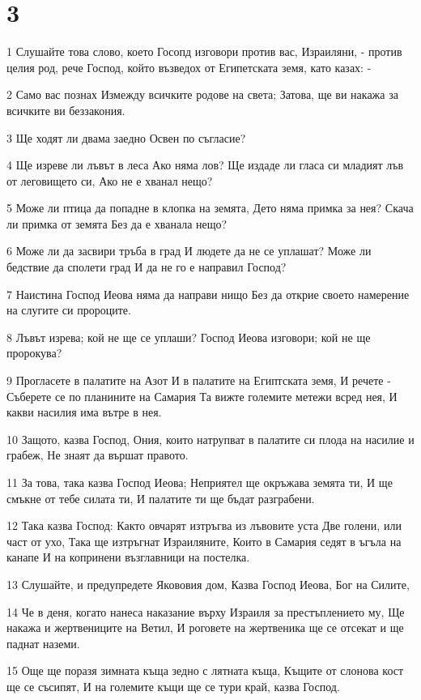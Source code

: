 \chapter{3}

\par 1 Слушайте това слово, което Госопд изговори против вас, Израиляни, - против целия род, рече Господ, който възведох от Египетската земя, като казах: -
\par 2 Само вас познах Измежду всичките родове на света; Затова, ще ви накажа за всичките ви беззакония.
\par 3 Ще ходят ли двама заедно Освен по съгласие?
\par 4 Ще изреве ли лъвът в леса Ако няма лов? Ще издаде ли гласа си младият лъв от леговището си, Ако не е хванал нещо?
\par 5 Може ли птица да попадне в клопка на земята, Дето няма примка за нея? Скача ли примка от земята Без да е хванала нещо?
\par 6 Може ли да засвири тръба в град И людете да не се уплашат? Може ли бедствие да сполети град И да не го е направил Господ?
\par 7 Наистина Господ Иеова няма да направи нищо Без да открие своето намерение на слугите си пророците.
\par 8 Лъвът изрева; кой не ще се уплаши? Господ Иеова изговори; кой не ще пророкува?
\par 9 Прогласете в палатите на Азот И в палатите на Египтската земя, И речете - Съберете се по планините на Самария Та вижте големите метежи всред нея, И какви насилия има вътре в нея.
\par 10 Защото, казва Господ, Ония, които натрупват в палатите си плода на насилие и грабеж, Не знаят да вършат правото.
\par 11 За това, така казва Господ Иеова; Неприятел ще окръжава земята ти, И ще смъкне от тебе силата ти, И палатите ти ще бъдат разграбени.
\par 12 Така казва Господ: Както овчарят изтръгва из лъвовите уста Две голени, или част от ухо, Така ще изтръгнат Израиляните, Които в Самария седят в ъгъла на канапе И на копринени възглавници на постелка.
\par 13 Слушайте, и предупредете Якововия дом, Казва Господ Иеова, Бог на Силите,
\par 14 Че в деня, когато нанеса наказание върху Израиля за престъплението му, Ще накажа и жертвениците на Ветил, И роговете на жертвеника ще се отсекат и ще паднат наземи.
\par 15 Още ще поразя зимната къща зедно с лятната къща, Къщите от слонова кост ще се съсипят, И на големите къщи ще се тури край, казва Господ.

